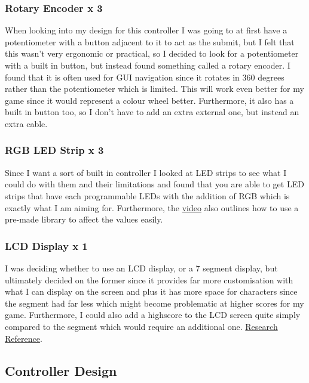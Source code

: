 \documentclass{article}
\begin{document}
\subsubsection{Rotary Encoder x 3}

When looking into my design for this controller I was going to at first have a potentiometer with a button adjacent to it to act as the submit, but I felt that this wasn't very ergonomic or practical, so I decided to look for a potentiometer with a built in button, but instead found something called a rotary encoder. I found that it is often used for GUI navigation since it rotates in 360 degrees rather than the potentiometer which is limited. This will work even better for my game since it would represent a colour wheel better. Furthermore, it also has a built in button too, so I don't have to add an extra external one, but instead an extra cable.

\subsubsection{RGB LED Strip x 3}

Since I want a sort of built in controller I looked at LED strips to see what I could do with them and their limitations and found that you are able to get LED strips that have each programmable LEDs with the addition of RGB which is exactly what I am aiming for. Furthermore, the \href{https://www.youtube.com/watch?v=UhYu0k2woRM}{video} also outlines how to use a pre-made library to affect the values easily.

\subsubsection{LCD Display x 1}

I was deciding whether to use an LCD display, or a 7 segment display, but ultimately decided on the former since it provides far more customisation with what I can display on the screen and plus it has more space for characters since the segment had far less which might become problematic at higher scores for my game. Furthermore, I could also add a highscore to the LCD screen quite simply compared to the segment which would require an additional one. \href{https://www.youtube.com/watch?v=dZZynJLmTn8}{Research Reference}.

\subsection{Controller Design}
\end{document}
